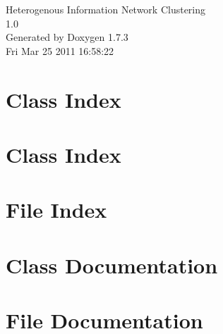 \documentclass[a4paper]{book}
\begin{document}
\hypersetup{pageanchor=false}
\begin{titlepage}
\vspace*{7cm}
\begin{center}
{\Large Heterogenous Information Network Clustering \\[1ex]\large 1.0 }\\
\vspace*{1cm}
{\large Generated by Doxygen 1.7.3}\\
\vspace*{0.5cm}
{\small Fri Mar 25 2011 16:58:22}\\
\end{center}
\end{titlepage}
\clearemptydoublepage
{}
\tableofcontents
\clearemptydoublepage
{}
\hypersetup{pageanchor=true}
\chapter{Class Index}

\chapter{Class Index}

\chapter{File Index}

\chapter{Class Documentation}







\chapter{File Documentation}





























\printindex
\end{document}
